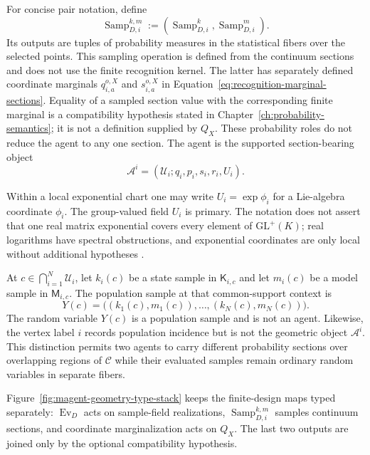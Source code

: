 For concise pair notation, define
\begin{equation}
\operatorname{Samp}_{D,i}^{k,m}
:=\left(\operatorname{Samp}_{D,i}^{k},
\operatorname{Samp}_{D,i}^{m}\right).
\label{eq:collective-continuum-section-sampling}
\end{equation}
Its outputs are tuples of probability measures in the statistical fibers over the selected points. This sampling operation is defined from the continuum sections and does not use the finite recognition kernel. The latter has separately defined coordinate marginals \(q_{i,a}^{o,X}\) and \(s_{i,a}^{o,X}\) in Equation~\eqref{eq:recognition-marginal-sections}. Equality of a sampled section value with the corresponding finite marginal is a compatibility hypothesis stated in Chapter~\ref{ch:probability-semantics}; it is not a definition supplied by \(Q_X\). These probability roles do not reduce the agent to any one section. The agent is the supported section-bearing object
\begin{equation}
\mathcal A^i=
\left(\mathcal U_i;q_i,p_i,s_i,r_i,U_i\right).
\label{eq:agent-object}
\end{equation}

Within a local exponential chart one may write \(U_i=\exp\phi_i\) for a Lie-algebra coordinate \(\phi_i\). The group-valued field \(U_i\) is primary. The notation does not assert that one real matrix exponential covers every element of \(\mathrm{GL}^{+}(K)\); real logarithms have spectral obstructions, and exponential coordinates are only local without additional hypotheses \citep{Higham2008}.

At \(c\in\bigcap_{i=1}^{N}\mathcal U_i\), let \(k_i(c)\) be a state sample in \(\mathsf K_{i,c}\) and let \(m_i(c)\) be a model sample in \(\mathsf M_{i,c}\). The population sample at that common-support context is
\begin{equation}
Y(c)=\bigl((k_1(c),m_1(c)),\ldots,(k_N(c),m_N(c))\bigr).
\label{eq:population-sample}
\end{equation}
The random variable \(Y(c)\) is a population sample and is not an agent. Likewise, the vertex label \(i\) records population incidence but is not the geometric object \(\mathcal A^i\). This distinction permits two agents to carry different probability sections over overlapping regions of \(\mathcal C\) while their evaluated samples remain ordinary random variables in separate fibers.

Figure~\ref{fig:magent-geometry-type-stack} keeps the finite-design maps typed separately: \(\operatorname{Ev}_D\) acts on sample-field realizations, \(\operatorname{Samp}_{D,i}^{k,m}\) samples continuum sections, and coordinate marginalization acts on \(Q_X\). The last two outputs are joined only by the optional compatibility hypothesis.

